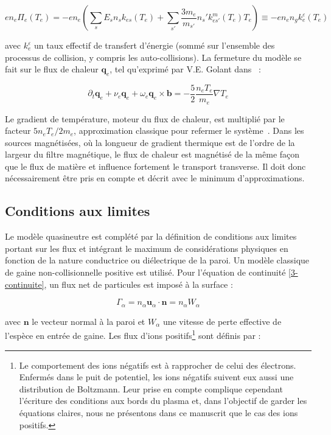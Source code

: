 \begin{refsection}
\begin{equation}
en_e\Pi_e(T_e)
=-en_e\left(\sum_{s}E_sn_sk_{es}(T_e)+\sum_{s'}\frac{3m_e}{m_{s'}}n_s'k^m_{es'}(T_e)T_e\right)
\equiv-en_en_gk^\varepsilon_e(T_e)
\end{equation}


avec $k_e^\varepsilon$ un taux effectif de transfert d'énergie (sommé sur 
l'ensemble des processus de collision, y compris les auto-collisions).
La fermeture du modèle se fait sur le flux de chaleur $\mathbf{q}_e$, tel qu'exprimé par V.E. Golant
dans~\parencite{Golant} :

\begin{equation}
\label{3-eqFluxChaleur}
\partial_t \mathbf{q}_e + \nu_e\mathbf{q}_e+\omega_e\mathbf{q}_e\times\mathbf{b} =
-\frac{5}{2}\frac{n_eT_e}{m_e}\nabla T_e
\end{equation}

Le gradient de température, moteur du flux de chaleur, est multiplié par le
facteur $5n_eT_e/2m_e$, approximation classique pour refermer le
système~\parencite{bittencourt}.
Dans les sources magnétisées,
où la longueur de gradient thermique est de l'ordre de la largeur
du filtre magnétique, le flux de chaleur est magnétisé de la même façon que le
flux de matière et influence fortement le transport transverse. Il doit donc
nécessairement être pris en compte et décrit avec le minimum d'approximations.

\subsection{Conditions aux limites}
Le modèle quasineutre est complété par la
définition de conditions aux limites portant sur les flux et intégrant le
maximum de considérations physiques en fonction de la nature conductrice ou
diélectrique de la paroi.
Un modèle classique de gaine non-collisionnelle positive est utilisé. Pour
l'équation de continuité \eqref{3-continuite}, un flux net de
particules est imposé à la surface :

\begin{equation}
	\Gamma_\alpha=n_\alpha\mathbf u_\alpha\cdot \mathbf n=n_\alpha W_\alpha
\end{equation} 

avec $\mathbf{n}$ le vecteur normal à la paroi et $W_\alpha$ une vitesse de
perte effective de l'espèce en entrée de gaine. Les flux d'ions
positifs\footnote{Le comportement des ions négatifs est à rapprocher de celui
des électrons. Enfermés dans le puit de potentiel, les ions négatifs
suivent eux aussi une distribution de Boltzmann. Leur prise en compte complique
cependant l'écriture des conditions aux bords du
plasma et, dans l'objectif de garder les équations claires, nous ne présentons
dans ce manuscrit que le cas des ions positifs.} sont définis par :


\end{refsection}
